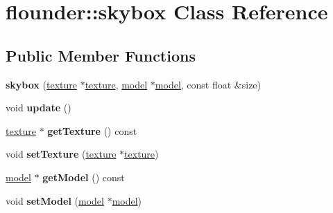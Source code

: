 \hypertarget{classflounder_1_1skybox}{}\section{flounder\+:\+:skybox Class Reference}
\label{classflounder_1_1skybox}
\subsection*{Public Member Functions}
\begin{DoxyCompactItemize}
\item 
\mbox{\label{classflounder_1_1skybox_aa1455b57d4792fe08c6bfb057f6c2286}} 
{\bfseries skybox} (\hyperlink{classflounder_1_1texture}{texture} $\ast$\hyperlink{classflounder_1_1texture}{texture}, \hyperlink{classflounder_1_1model}{model} $\ast$\hyperlink{classflounder_1_1model}{model}, const float \&size)
\item 
\mbox{\label{classflounder_1_1skybox_a0b368ba1d40f9dc7008875e720f28dc6}} 
void {\bfseries update} ()
\item 
\mbox{\label{classflounder_1_1skybox_a6f53dcb82efec83bdc780287c1191068}} 
\hyperlink{classflounder_1_1texture}{texture} $\ast$ {\bfseries get\+Texture} () const
\item 
\mbox{\label{classflounder_1_1skybox_a52535c9e9cc91303301be8337f5d56b3}} 
void {\bfseries set\+Texture} (\hyperlink{classflounder_1_1texture}{texture} $\ast$\hyperlink{classflounder_1_1texture}{texture})
\item 
\mbox{\label{classflounder_1_1skybox_a1c53d96cf2034902056d7f94505bc774}} 
\hyperlink{classflounder_1_1model}{model} $\ast$ {\bfseries get\+Model} () const
\item 
\mbox{\label{classflounder_1_1skybox_a72040c886a38cfc5dccb1b7d93471bee}} 
void {\bfseries set\+Model} (\hyperlink{classflounder_1_1model}{model} $\ast$\hyperlink{classflounder_1_1model}{model})
\item 
\mbox{\label{classflounder_1_1skybox_af4d94740baacf25d7919efac7c88ecf4}} 

\end{DoxyCompactItemize}
